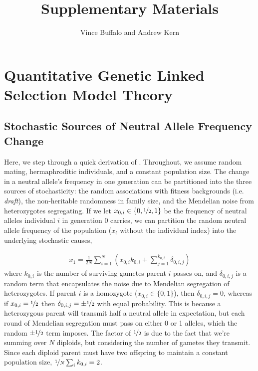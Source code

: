 \documentclass[11pt]{article}
\title{Supplementary Materials}
\author{Vince Buffalo and Andrew Kern}
\begin{document}
\maketitle

\tableofcontents

\section{Quantitative Genetic Linked Selection Model Theory}
\label{supp:theory}

\subsection{Stochastic Sources of Neutral Allele Frequency Change}

Here, we step through a quick derivation of \textcite{Santiago1995-hx}.
Throughout, we assume random mating, hermaphroditic individuals, and a constant
population size. The change in a neutral allele's frequency in one generation
can be partitioned into the three sources of stochasticity: the random
associations with fitness backgrounds (i.e. \emph{draft}), the non-heritable
randomness in family size, and the Mendelian noise from heterozygotes
segregating. If we let $x_{0,i} \in \{0, \nicefrac{1}{2}, 1\}$ be the frequency
of neutral alleles individual $i$ in generation 0 carries, we can partition the
random neutral allele frequency of the population ($x_t$ without the individual
index) into the underlying stochastic causes,

\begin{align}
  x_1 = \frac{1}{2N} \sum_{i=1}^N \left( x_{0,i}k_{0,i} + \sum_{j=1}^{k_{0,i}} \delta_{0,i,j} \right)
\end{align}
%
where $k_{0,i}$ is the number of surviving gametes parent $i$ passes on, and
$\delta_{0,i,j}$ is a random term that encapsulates the noise due to Mendelian
segregation of heterozygotes. If parent $i$ is a homozygote ($x_{0,i} \in \{0,
1\}$), then $\delta_{0,i,j} = 0$, whereas if $x_{0,i} = \nicefrac{1}{2}$ then
$\delta_{0,i,j} = \pm \nicefrac{1}{2}$ with equal probability. This is because
a heterozygous parent will transmit half a neutral allele in expectation, but
each round of Mendelian segregation must pass on either 0 or 1 alleles, which
the random $\pm \nicefrac{1}{2}$ term imposes. The factor of $\nicefrac{1}{2}$
is due to the fact that we're summing over $N$ diploids, but considering the
number of gametes they transmit. Since each diploid parent must have two
offspring to maintain a constant population size, $\nicefrac{1}{N} \sum_i
k_{0,i} = 2$. 
\end{document}
